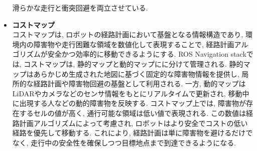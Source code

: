 \begin{itemize}
     滑らかな走行と衝突回避を両立させている. 
     \item \textbf{コストマップ}\\
     コストマップは, ロボットの経路計画において基盤となる情報構造であり, 環境内の障害物や走行困難な領域を数値化して表現することで, 
     経路計画アルゴリズムが安全かつ効率的に移動できるようにする. 
     ROS Navigation stackでは, コストマップは, 静的マップと動的マップにに分けて管理される. 
     静的マップはあらかじめ生成された地図に基づく固定的な障害物情報を提供し, 
     局所的な経路計画や障害物回避の基盤として利用される. 
     一方, 動的マップはLiDARやカメラなどのセンサ情報をもとにリアルタイムで更新され, 
     移動中に出現する人などの動的障害物を反映する. コストマップ上では, 
     障害物が存在するセルの値が高く, 通行可能な領域は低い値で表現される. 
     この数値は経路計画アルゴリズムによって考慮され, ロボットはより安全でコストの低い経路を優先して移動する. 
     これにより, 経路計画は単に障害物を避けるだけでなく, 走行中の安全性を確保しつつ目標地点まで到達できるようになる. 
\end{itemize}